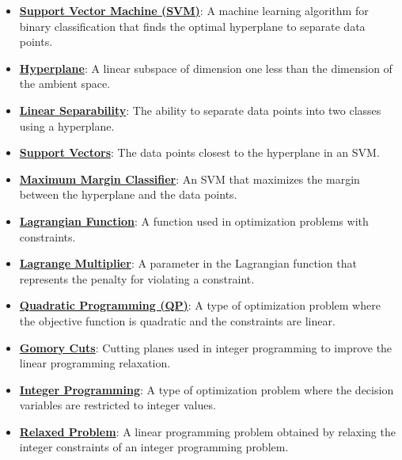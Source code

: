 \documentclass{article}%
\begin{document}
\begin{itemize}[leftmargin=*]
\item \href{https://www.math.purdue.edu/~yipn/421/2024-12-03-Duality.pdf#page=1}{\textbf{Support Vector Machine (SVM)}}: A machine learning algorithm for binary classification that finds the optimal hyperplane to separate data points. %
\item \href{https://www.math.purdue.edu/~yipn/421/2024-12-03-Duality.pdf#page=1}{\textbf{Hyperplane}}: A linear subspace of dimension one less than the dimension of the ambient space. %
\item \href{https://www.math.purdue.edu/~yipn/421/2024-12-03-Duality.pdf#page=1}{\textbf{Linear Separability}}: The ability to separate data points into two classes using a hyperplane. %
\item \href{https://www.math.purdue.edu/~yipn/421/2024-12-03-Duality.pdf#page=1}{\textbf{Support Vectors}}: The data points closest to the hyperplane in an SVM. %
\item \href{https://www.math.purdue.edu/~yipn/421/2024-12-03-Duality.pdf#page=1}{\textbf{Maximum Margin Classifier}}: An SVM that maximizes the margin between the hyperplane and the data points. %
\item \href{https://www.math.purdue.edu/~yipn/421/2024-12-03-Duality.pdf#page=1}{\textbf{Lagrangian Function}}: A function used in optimization problems with constraints. %
\item \href{https://www.math.purdue.edu/~yipn/421/2024-12-03-Duality.pdf#page=1}{\textbf{Lagrange Multiplier}}: A parameter in the Lagrangian function that represents the penalty for violating a constraint. %
\item \href{https://www.math.purdue.edu/~yipn/421/2024-12-03-Duality.pdf#page=1}{\textbf{Quadratic Programming (QP)}}: A type of optimization problem where the objective function is quadratic and the constraints are linear. %
\item \href{https://www.math.purdue.edu/~yipn/421/2024-12-03-Duality.pdf#page=1}{\textbf{Gomory Cuts}}: Cutting planes used in integer programming to improve the linear programming relaxation. %
\item \href{https://www.math.purdue.edu/~yipn/421/2024-12-03-Duality.pdf#page=1}{\textbf{Integer Programming}}: A type of optimization problem where the decision variables are restricted to integer values. %
\item \href{https://www.math.purdue.edu/~yipn/421/2024-12-03-Duality.pdf#page=1}{\textbf{Relaxed Problem}}: A linear programming problem obtained by relaxing the integer constraints of an integer programming problem. %

\end{itemize}
\end{document}

